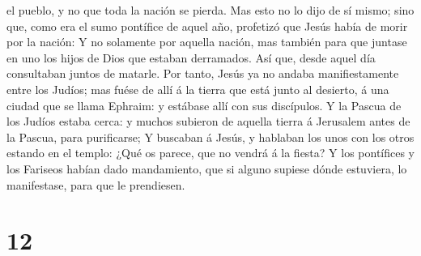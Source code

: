 el pueblo, y no que toda la nación se pierda.  Mas esto no
lo dijo de sí mismo; sino que, como era el sumo pontífice de aquel año,
profetizó que Jesús había de morir por la nación:  Y no
solamente por aquella nación, mas también para que juntase en uno los
hijos de Dios que estaban derramados.  Así que, desde aquel
día consultaban juntos de matarle.  Por tanto, Jesús ya no
andaba manifiestamente entre los Judíos; mas fuése de allí á la tierra
que está junto al desierto, á una ciudad que se llama Ephraim: y
estábase allí con sus discípulos.  Y la Pascua de los
Judíos estaba cerca: y muchos subieron de aquella tierra á Jerusalem
antes de la Pascua, para purificarse;  Y buscaban á Jesús,
y hablaban los unos con los otros estando en el templo: ¿Qué os parece,
que no vendrá á la fiesta?  Y los pontífices y los Fariseos
habían dado mandamiento, que si alguno supiese dónde estuviera, lo
manifestase, para que le prendiesen.

\hypertarget{section-11}{%
\section{12}\label{section-11}}

